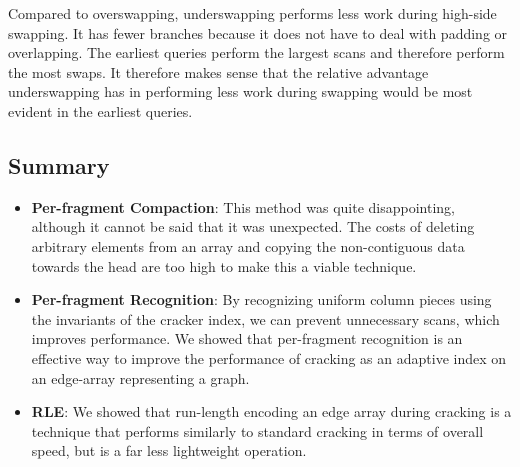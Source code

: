 Compared to overswapping, underswapping performs less work during high-side swapping. It has fewer branches because it does not have to deal with padding or overlapping. The earliest queries perform the largest scans and therefore perform the most swaps. It therefore makes sense that the relative advantage underswapping has in performing less work during swapping would be most evident in the earliest queries.

\subsection{Summary}

\begin{itemize}
\item \textbf{Per-fragment Compaction}: This method was quite disappointing, although it cannot be said that it was unexpected. The costs of deleting arbitrary elements from an array and copying the non-contiguous data towards the head are too high to make this a viable technique.
\item \textbf{Per-fragment Recognition}: By recognizing uniform column pieces using the invariants of the cracker index, we can prevent unnecessary scans, which improves performance. We showed that per-fragment recognition is an effective way to improve the performance of cracking as an adaptive index on an edge-array representing a graph.
\item \textbf{RLE}: We showed that run-length encoding an edge array during cracking is a technique that performs similarly to standard cracking in terms of overall speed, but is a far less lightweight operation.
\end{itemize}